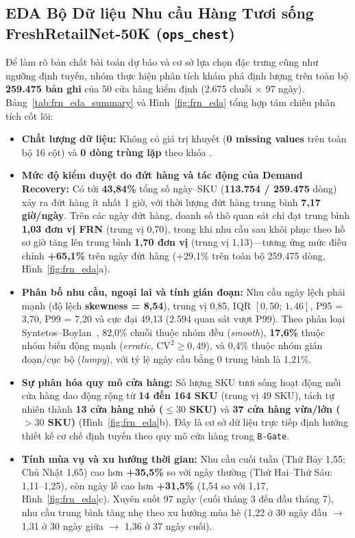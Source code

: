 \subsection*{EDA Bộ Dữ liệu Nhu cầu Hàng Tươi sống FreshRetailNet-50K (\texttt{ops\_chest})}
Để làm rõ bản chất bài toán dự báo và cơ sở lựa chọn đặc trưng cũng như ngưỡng định tuyến, nhóm thực hiện phân tích khám phá định lượng trên toàn bộ \textbf{259.475 bản ghi} của 50 cửa hàng kiểm định (2.675 chuỗi $\times$ 97 ngày). Bảng~\ref{tab:frn_eda_summary} và Hình~\ref{fig:frn_eda} tổng hợp tám chiều phân tích cốt lõi:
\begin{itemize}
    \item \textbf{Chất lượng dữ liệu:} Không có giá trị khuyết (\textbf{0 missing values} trên toàn bộ 16 cột) và \textbf{0 dòng trùng lặp} theo khóa .
    \item \textbf{Mức độ kiểm duyệt do đứt hàng và tác động của Demand Recovery:} Có tới \textbf{43,84\%} tổng số ngày--SKU (\textbf{113.754 / 259.475} dòng) xảy ra đứt hàng ít nhất 1 giờ, với thời lượng đứt hàng trung bình \textbf{7,17 giờ/ngày}. Trên các ngày đứt hàng, doanh số thô quan sát chỉ đạt trung bình \textbf{1,03 đơn vị FRN} (trung vị 0,70), trong khi nhu cầu sau khôi phục theo hồ sơ giờ tăng lên trung bình \textbf{1,70 đơn vị} (trung vị 1,13)---tương ứng mức điều chỉnh \textbf{+65,1\%} trên ngày đứt hàng (+29,1\% trên toàn bộ 259.475 dòng, Hình~\ref{fig:frn_eda}a).
    \item \textbf{Phân bố nhu cầu, ngoại lai và tính gián đoạn:} Nhu cầu ngày lệch phải mạnh (độ lệch \textbf{skewness = 8,54}), trung vị 0,85, IQR $[0{,}50;\,1{,}46]$, P95 = 3,70, P99 = 7,20 và cực đại 49,13 (2.594 quan sát vượt P99). Theo phân loại Syntetos--Boylan~\cite{syntetos2005intermittent}, 82,0\% chuỗi thuộc nhóm đều (\emph{smooth}), \textbf{17,6\%} thuộc nhóm biến động mạnh (\emph{erratic}, $\text{CV}^2 \ge 0{,}49$), và 0,4\% thuộc nhóm gián đoạn/cục bộ (\emph{lumpy}), với tỷ lệ ngày cầu bằng 0 trung bình là 1,21\%.
    \item \textbf{Sự phân hóa quy mô cửa hàng:} Số lượng SKU tươi sống hoạt động mỗi cửa hàng dao động rộng từ \textbf{14 đến 164 SKU} (trung vị 49 SKU), tách tự nhiên thành \textbf{13 cửa hàng nhỏ ($\le 30$ SKU)} và \textbf{37 cửa hàng vừa/lớn ($> 30$ SKU)} (Hình~\ref{fig:frn_eda}b). Đây là cơ sở dữ liệu trực tiếp định hướng thiết kế cơ chế định tuyến theo quy mô cửa hàng trong \texttt{B-Gate}.
    \item \textbf{Tính mùa vụ và xu hướng thời gian:} Nhu cầu cuối tuần (Thứ Bảy 1,55; Chủ Nhật 1,65) cao hơn \textbf{+35,5\%} so với ngày thường (Thứ Hai--Thứ Sáu: 1,11--1,25), còn ngày lễ cao hơn \textbf{+31,5\%} (1,54 so với 1,17, Hình~\ref{fig:frn_eda}c). Xuyên suốt 97 ngày (cuối tháng 3 đến đầu tháng 7), nhu cầu trung bình tăng nhẹ theo xu hướng mùa hè (1,22 ở 30 ngày đầu $\to$ 1,31 ở 30 ngày giữa $\to$ 1,36 ở 37 ngày cuối).

\end{itemize}
